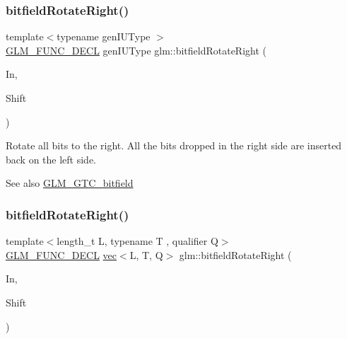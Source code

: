 \subsubsection{\texorpdfstring{bitfield\+Rotate\+Right()}{bitfieldRotateRight()}\hspace{0.1cm}{\footnotesize\ttfamily [1/2]}}
{\footnotesize\ttfamily template$<$typename gen\+I\+U\+Type $>$ \\
\hyperlink{setup_8hpp_ab2d052de21a70539923e9bcbf6e83a51}{G\+L\+M\+\_\+\+F\+U\+N\+C\+\_\+\+D\+E\+CL} gen\+I\+U\+Type glm\+::bitfield\+Rotate\+Right (\begin{DoxyParamCaption}\item[{gen\+I\+U\+Type}]{In,  }\item[{int}]{Shift }\end{DoxyParamCaption})}

Rotate all bits to the right. All the bits dropped in the right side are inserted back on the left side.

\begin{DoxySeeAlso}{See also}
\hyperlink{group__gtc__bitfield}{G\+L\+M\+\_\+\+G\+T\+C\+\_\+bitfield} 
\end{DoxySeeAlso}
\mbox{\label{group__gtc__bitfield_ga590488e1fc00a6cfe5d3bcaf93fbfe88}} 
\subsubsection{\texorpdfstring{bitfield\+Rotate\+Right()}{bitfieldRotateRight()}\hspace{0.1cm}{\footnotesize\ttfamily [2/2]}}
{\footnotesize\ttfamily template$<$length\+\_\+t L, typename T , qualifier Q$>$ \\
\hyperlink{setup_8hpp_ab2d052de21a70539923e9bcbf6e83a51}{G\+L\+M\+\_\+\+F\+U\+N\+C\+\_\+\+D\+E\+CL} \hyperlink{structglm_1_1vec}{vec}$<$L, T, Q$>$ glm\+::bitfield\+Rotate\+Right (\begin{DoxyParamCaption}\item[{\hyperlink{structglm_1_1vec}{vec}$<$ L, T, Q $>$ const \&}]{In,  }\item[{int}]{Shift }\end{DoxyParamCaption})}

